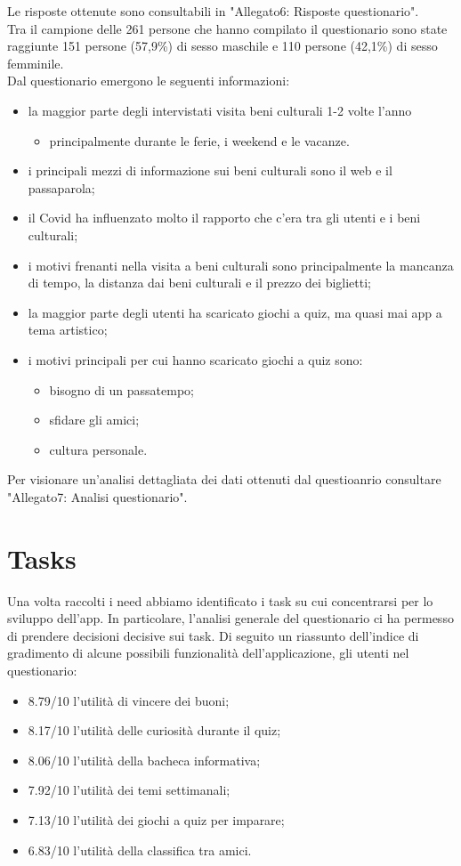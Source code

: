 \documentclass{article}
\begin{document}
Le risposte ottenute sono consultabili in "Allegato6: Risposte questionario"\cite{Allegato6}.\\\indent
Tra il campione delle 261 persone che hanno compilato il questionario sono state raggiunte 151 persone (57,9\%) di sesso maschile e 110 persone (42,1\%) di sesso femminile.\\\indent
Dal questionario emergono le seguenti informazioni:
\begin{itemize}
\item la maggior parte degli intervistati visita beni culturali 1-2 volte l’anno
\begin{itemize}
\item principalmente durante le ferie, i weekend e le vacanze.
\end{itemize}
\item i principali mezzi di informazione sui beni culturali sono il web e il passaparola;
\item il Covid ha influenzato molto il rapporto che c’era tra gli utenti e i beni culturali;
\item i motivi frenanti nella visita a beni culturali sono principalmente la mancanza di tempo, la distanza dai beni culturali e il prezzo dei biglietti;
\item la maggior parte degli utenti ha scaricato giochi a quiz, ma quasi mai app a tema artistico;
\item i motivi principali per cui hanno scaricato giochi a quiz sono:
\begin{itemize}
\item bisogno di un passatempo;
\item sfidare gli amici;
\item cultura personale.
\end{itemize}
\end{itemize}
Per visionare un'analisi dettagliata dei dati ottenuti dal questioanrio consultare "Allegato7: Analisi questionario"\cite{Allegato7}.

\section{Tasks}
Una volta raccolti i need abbiamo identificato i task su cui concentrarsi per lo sviluppo dell’app. In particolare, l’analisi generale del questionario ci ha permesso di prendere decisioni decisive sui task. Di seguito un riassunto dell’indice di gradimento di alcune possibili funzionalità dell’applicazione, gli utenti nel questionario:
\begin{itemize}
\item 8.79/10 l’utilità di vincere dei buoni;
\item 8.17/10 l’utilità delle curiosità durante il quiz;
\item 8.06/10 l’utilità della bacheca informativa;
\item 7.92/10 l’utilità dei temi settimanali;
\item 7.13/10 l’utilità dei giochi a quiz per imparare;
\item 6.83/10 l’utilità della classifica tra amici.
\end{itemize}
\end{document}
